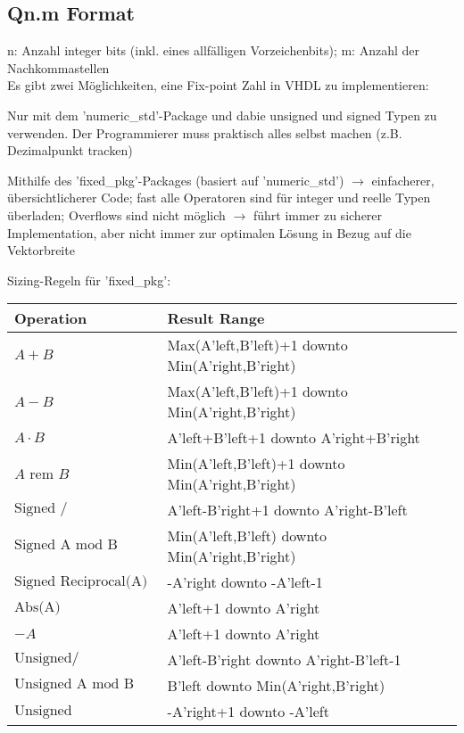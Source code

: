 \subsection{Qn.m Format}$~$ \\
n: Anzahl integer bits (inkl. eines allfälligen Vorzeichenbits); m: Anzahl der Nachkommastellen\\
Es gibt zwei Möglichkeiten, eine Fix-point Zahl in VHDL zu implementieren:
\begin{compactitem}
  \item Nur mit dem 'numeric\_std'-Package und dabie unsigned und signed Typen zu verwenden. Der Programmierer muss praktisch alles selbst machen (z.B. Dezimalpunkt tracken)
  \item Mithilfe des 'fixed\_pkg'-Packages (basiert auf 'numeric\_std') $\rightarrow$ einfacherer, übersichtlicherer Code; fast alle Operatoren sind für integer und reelle Typen überladen; Overflows sind nicht möglich $\rightarrow$ führt immer zu sicherer Implementation, aber nicht immer zur optimalen Lösung in Bezug auf die Vektorbreite
\end{compactitem}
Sizing-Regeln für 'fixed\_pkg':\\
\begin{tabular}{| l | l |}
\hline
Operation & Result Range\\
\hline
$A+B$ & Max(A'left,B'left)+1 downto Min(A'right,B'right)\\
\hline
$A-B$ & Max(A'left,B'left)+1 downto Min(A'right,B'right)\\
\hline
$A \cdot B$ & A'left+B'left+1 downto A'right+B'right\\
\hline
$A \text{ rem } B$ & Min(A'left,B'left)+1 downto Min(A'right,B'right)\\
\hline
$\text{Signed } /$ & A'left-B'right+1 downto A'right-B'left\\
\hline
$\text{Signed A mod B}$ & Min(A'left,B'left) downto Min(A'right,B'right)\\
\hline
$\text{Signed Reciprocal(A)}$ & -A'right downto -A'left-1\\
\hline
$\text{Abs(A)}$ & A'left+1 downto A'right\\
\hline
$-A$ & A'left+1 downto A'right\\
\hline
$\text{Unsigned} /$ & A'left-B'right downto A'right-B'left-1\\
\hline
$\text{Unsigned A mod B}$ & B'left downto Min(A'right,B'right)\\
\hline
$\text{Unsigned Reciprocal(A)}$ & -A'right+1 downto -A'left\\
\hline
\end{tabular}

